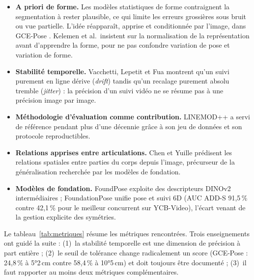 \documentclass[11pt,a4paper]{report}
\begin{document}
\begin{itemize}
    \item \textbf{A priori de forme.} Les modèles statistiques de forme \cite{neumann1998ssm,kelemen1999elastic}
    contraignent la segmentation à rester plausible, ce qui limite les erreurs grossières sous bruit ou vue
    partielle. L'idée réapparaît, apprise et conditionnée par l'image, dans GCE-Pose \cite{li2025gcepose}.
    Kelemen et al.\ insistent sur la normalisation de la représentation avant d'apprendre la forme, pour ne pas
    confondre variation de pose et variation de forme.
    \item \textbf{Stabilité temporelle.} Vacchetti, Lepetit et Fua \cite{vacchetti2004stable} montrent qu'un suivi
    purement en ligne dérive (\emph{drift}) tandis qu'un recalage purement absolu tremble (\emph{jitter}) : la
    précision d'un suivi vidéo ne se résume pas à une précision image par image.
    \item \textbf{Méthodologie d'évaluation comme contribution.} LINEMOD++ \cite{hinterstoisser2012linemod} a
    servi de référence pendant plus d'une décennie grâce à son jeu de données et son protocole reproductibles.
    \item \textbf{Relations apprises entre articulations.} Chen et Yuille \cite{chen2014articulated} prédisent les
    relations spatiales entre parties du corps depuis l'image, précurseur de la généralisation recherchée par les
    modèles de fondation.
    \item \textbf{Modèles de fondation.} FoundPose \cite{ornek2023foundpose} exploite des descripteurs DINOv2
    intermédiaires ; FoundationPose \cite{wen2024foundationpose} unifie pose et suivi 6D (AUC ADD-S 91,5\,\% contre
    42,1\,\% pour le meilleur concurrent sur YCB-Video), l'écart venant de la gestion explicite des symétries.
\end{itemize}

Le tableau~\ref{tab:metriques} résume les métriques rencontrées. Trois enseignements ont guidé la suite : (1)~la
stabilité temporelle est une dimension de précision à part entière ; (2)~le seuil de tolérance change radicalement
un score (GCE-Pose : 24,8\,\% à 5°2\,cm contre 58,4\,\% à 10°5\,cm) et doit toujours être documenté ;
(3)~il faut rapporter au moins deux métriques complémentaires.
\end{document}

